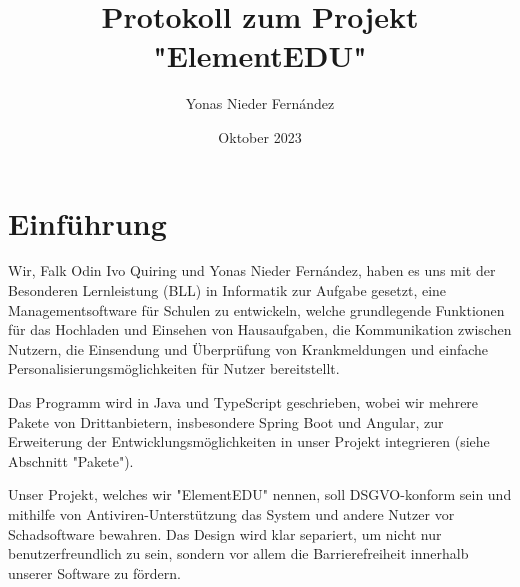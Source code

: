 \documentclass{article}
\title{Protokoll zum Projekt "ElementEDU"}
\author{Yonas Nieder Fernández}
\date{Oktober 2023}
\begin{document}
\maketitle

\section{Einführung}

Wir, Falk Odin Ivo Quiring und Yonas Nieder Fernández, haben es uns mit der Besonderen Lernleistung (BLL) in Informatik zur Aufgabe gesetzt, eine Managementsoftware für Schulen zu entwickeln, welche grundlegende Funktionen für das Hochladen und Einsehen von Hausaufgaben, die Kommunikation zwischen Nutzern, die Einsendung und Überprüfung von Krankmeldungen und einfache Personalisierungsmöglichkeiten für Nutzer bereitstellt.

Das Programm wird in Java und TypeScript geschrieben, wobei wir mehrere Pakete von Drittanbietern, insbesondere Spring Boot und Angular, zur Erweiterung der Entwicklungsmöglichkeiten in unser Projekt integrieren (siehe Abschnitt "Pakete"). 

Unser Projekt, welches wir "ElementEDU" nennen, soll DSGVO-konform sein und mithilfe von Antiviren-Unterstützung das System und andere Nutzer vor Schadsoftware bewahren. Das Design wird klar separiert, um nicht nur benutzerfreundlich zu sein, sondern vor allem die Barrierefreiheit innerhalb unserer Software zu fördern. 
\end{document}
